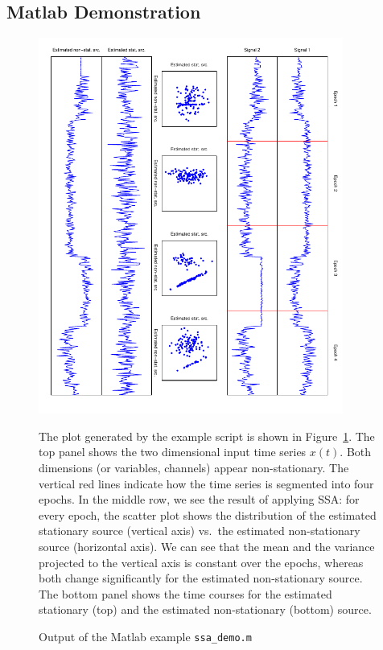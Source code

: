 \documentclass{article}
\newcommand{\1}{\ensuremath{\mathds{1}}}
\newcommand{\0}{\ensuremath{0}}
\begin{document}
\clearpage

\subsection{Matlab Demonstration}
\begin{figure}[h]
\begin{center}
	\includegraphics[angle=90,width=10cm]{ssa_example.pdf}
	\caption{\label{fig:matlab_example}
		Output of the Matlab example \texttt{ssa\_demo.m}} 
\end{center}
The plot generated by the example script is shown in Figure~\ref{fig:matlab_example}. The top panel
shows the two dimensional input time series $x(t)$. Both dimensions (or variables, channels) appear
non-stationary. The vertical red lines indicate how the time series is segmented into four epochs. 
In the middle row, we see the result of applying SSA: for every epoch, the scatter plot shows
the distribution of the estimated stationary source (vertical axis) vs.~the estimated non-stationary 
source (horizontal axis). We can see that the mean and the variance projected to the vertical axis
is constant over the epochs, whereas both change significantly for the estimated non-stationary source. 
The bottom panel shows the time courses for the estimated stationary (top) and the estimated non-stationary 
(bottom) source. 
\end{figure}
\end{document}
